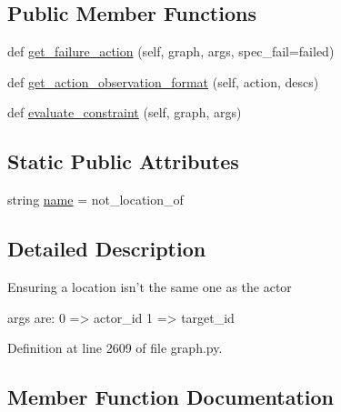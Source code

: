 \subsection*{Public Member Functions}
\begin{DoxyCompactItemize}
\item 
def \hyperlink{classlight__chats_1_1graph_1_1NotLocationOfConstraint_a77abc55b110bb7287c88b7623fe06d13}{get\+\_\+failure\+\_\+action} (self, graph, args, spec\+\_\+fail=\textquotesingle{}failed\textquotesingle{})
\item 
def \hyperlink{classlight__chats_1_1graph_1_1NotLocationOfConstraint_a4b286f6eeac9d64784dc03087771dc72}{get\+\_\+action\+\_\+observation\+\_\+format} (self, action, descs)
\item 
def \hyperlink{classlight__chats_1_1graph_1_1NotLocationOfConstraint_a0ce5d519bdec3eb540e09bdec4cc3bef}{evaluate\+\_\+constraint} (self, graph, args)
\end{DoxyCompactItemize}
\subsection*{Static Public Attributes}
\begin{DoxyCompactItemize}
\item 
string \hyperlink{classlight__chats_1_1graph_1_1NotLocationOfConstraint_a25a64327543d978ac8b81ae8be5624e8}{name} = \textquotesingle{}not\+\_\+location\+\_\+of\textquotesingle{}
\end{DoxyCompactItemize}


\subsection{Detailed Description}
\begin{DoxyVerb}Ensuring a location isn't the same one as the actor

args are:
    0 => actor_id
    1 => target_id
\end{DoxyVerb}
 

Definition at line 2609 of file graph.\+py.



\subsection{Member Function Documentation}
\mbox{\label{classlight__chats_1_1graph_1_1NotLocationOfConstraint_a0ce5d519bdec3eb540e09bdec4cc3bef}} 

